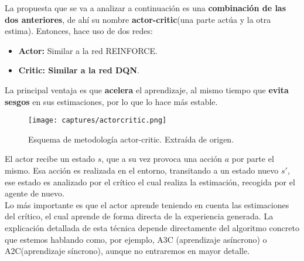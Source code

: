 \documentclass[11pt,fleqn]{book} %
\begin{document}
La propuesta que se va a analizar a continuación es una \textbf{combinación de las dos anteriores}, de ahí su nombre \textbf{actor-critic}(una parte actúa y la otra estima). Entonces, hace uso de dos redes:

\begin{itemize}
	\item \textbf{Actor:} Similar a la red REINFORCE.\\
	
	\item \textbf{Critic: Similar a la red DQN}. 
\end{itemize}

La principal ventaja es que \textbf{acelera} el aprendizaje, al mismo tiempo que \textbf{evita sesgos} en sus estimaciones, por lo que lo hace más estable.

\begin{figure}[H]
	\centering\texttt{[image: captures/actorcritic.png]}
	\caption{Esquema de metodología actor-critic. Extraída de origen. \cite{article:RLromero}}
	\label{fig:actorcritic} %
\end{figure}

El actor recibe un estado $s$, que a su vez provoca una acción $a$ por parte el mismo. Esa acción es realizada en el entorno, transitando a un estado nuevo $s'$, ese estado es analizado por el crítico el cual realiza la estimación, recogida por el agente de nuevo. \\

Lo más importante es que el actor aprende teniendo en cuenta las estimaciones del crítico, el cual aprende de forma directa de la experiencia generada. La explicación detallada de esta técnica depende directamente del algoritmo concreto que estemos hablando como, por ejemplo, A3C (aprendizaje asíncrono) o A2C(aprendizaje síncrono), aunque no entraremos en mayor detalle.

\end{document}
